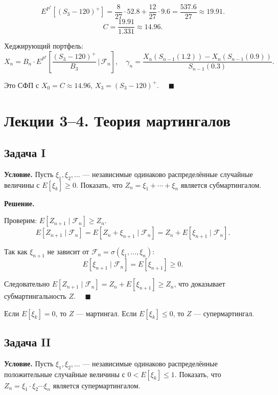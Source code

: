 \documentclass[12pt,a4paper]{article}
\theoremstyle{zadacha}
\begin{document}
\[
E^{P^*}[(S_3-120)^+] = \frac{8}{27} \cdot 52.8 + \frac{12}{27} \cdot 9.6 = \frac{537.6}{27} \approx 19.91.
\]
\[
C = \frac{19.91}{1.331} \approx 14.96.
\]

Хеджирующий портфель:
\[
X_n = B_n \cdot E^{P^*}\!\left[\frac{(S_3 - 120)^+}{B_3} \,\bigg|\, \mathcal{F}_n\right], \quad
\gamma_n = \frac{X_n(S_{n-1}(1.2)) - X_n(S_{n-1}(0.9))}{S_{n-1}(0.3)}.
\]

Это СФП с $X_0 = C \approx 14.96$, $X_3 = (S_3 - 120)^+$. $\quad\blacksquare$

\section{Лекции 3–4. Теория мартингалов}

\subsection*{Задача I}

\textbf{Условие.} Пусть $\xi_1, \xi_2, \ldots$ — независимые одинаково распределённые случайные величины с $E[\xi_k] \geq 0$. Показать, что $Z_n = \xi_1 + \cdots + \xi_n$ является субмартингалом.

\medskip
\textbf{Решение.}

Проверим: $E[Z_{n+1} \mid \mathcal{F}_n] \geq Z_n$.
\[
E[Z_{n+1} \mid \mathcal{F}_n] = E[Z_n + \xi_{n+1} \mid \mathcal{F}_n] = Z_n + E[\xi_{n+1} \mid \mathcal{F}_n].
\]

Так как $\xi_{n+1}$ не зависит от $\mathcal{F}_n = \sigma(\xi_1, \ldots, \xi_n)$:
\[
E[\xi_{n+1} \mid \mathcal{F}_n] = E[\xi_{n+1}] \geq 0.
\]

Следовательно $E[Z_{n+1} \mid \mathcal{F}_n] = Z_n + E[\xi_{n+1}] \geq Z_n$, что доказывает субмартингальность $Z$. $\quad\blacksquare$

\begin{remark}
Если $E[\xi_k] = 0$, то $Z$ --- мартингал. Если $E[\xi_k] \leq 0$, то $Z$ --- супермартингал.
\end{remark}

\subsection*{Задача II}

\textbf{Условие.} Пусть $\xi_1, \xi_2, \ldots$ --- независимые одинаково распределённые положительные случайные величины с $0 < E[\xi_k] \leq 1$. Показать, что $Z_n = \xi_1 \cdot \xi_2 \cdots \xi_n$ является супермартингалом.
\end{document}
